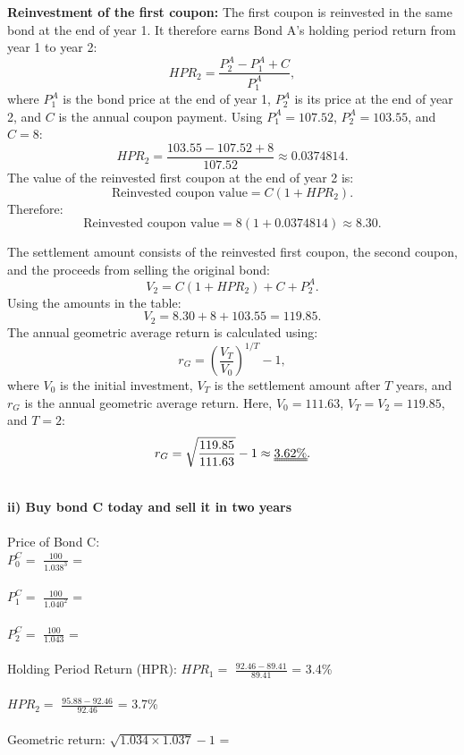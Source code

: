 \documentclass[12]{article}
\begin{document}
\noindent\textbf{Reinvestment of the first coupon:}
The first coupon is reinvested in the same bond at the end of year 1. It therefore earns Bond A's holding period return from year 1 to year 2:
\[
HPR_2=\frac{P_2^A-P_1^A+C}{P_1^A},
\]
where $P_1^A$ is the bond price at the end of year 1, $P_2^A$ is its price at the end of year 2, and $C$ is the annual coupon payment.
Using $P_1^A=107.52$, $P_2^A=103.55$, and $C=8$:
\[
HPR_2=\frac{103.55-107.52+8}{107.52}\approx0.0374814.
\]
The value of the reinvested first coupon at the end of year 2 is:
\[
\text{Reinvested coupon value}=C(1+HPR_2).
\]
Therefore:
\[
\text{Reinvested coupon value}=8(1+0.0374814)\approx8.30.
\]

\begin{table}[H]
    \centering
    \label{tab:my_label}
\end{table}

\noindent The settlement amount consists of the reinvested first coupon, the second coupon, and the proceeds from selling the original bond:
\[
V_2=C(1+HPR_2)+C+P_2^A.
\]
Using the amounts in the table:
\[
V_2=8.30+8+103.55=119.85.
\]
The annual geometric average return is calculated using:
\[
r_G=\left(\frac{V_T}{V_0}\right)^{1/T}-1,
\]
where $V_0$ is the initial investment, $V_T$ is the settlement amount after $T$ years, and $r_G$ is the annual geometric average return.
Here, $V_0=111.63$, $V_T=V_2=119.85$, and $T=2$:
\[
r_G=\sqrt{\frac{119.85}{111.63}}-1\approx\text{\uuline{3.62\%}}.
\]

\noindent
\\
\textbf{ii) Buy bond C today and sell it in two years}\\
\\
Price of Bond C:\\
$P_0^C =$ {\Large $\frac{100}{1.038^3}$} = \\
\\
$P_1^C =$ {\Large $\frac{100}{1.040^2}$} = \\
\\
$P_2^C =$ {\Large $\frac{100}{1.043}$} = \\
\\
Holding Period Return (HPR):
$HPR_1 =$ {\Large $\frac{92.46 - 89.41}{89.41}$} = 3.4\%\\
\\
$HPR_2 =$ {\Large $\frac{95.88 - 92.46}{92.46}$} = 3.7\%\\
\\
Geometric return: $\sqrt{1.034 \times 1.037} - 1$ = 
\end{document}
